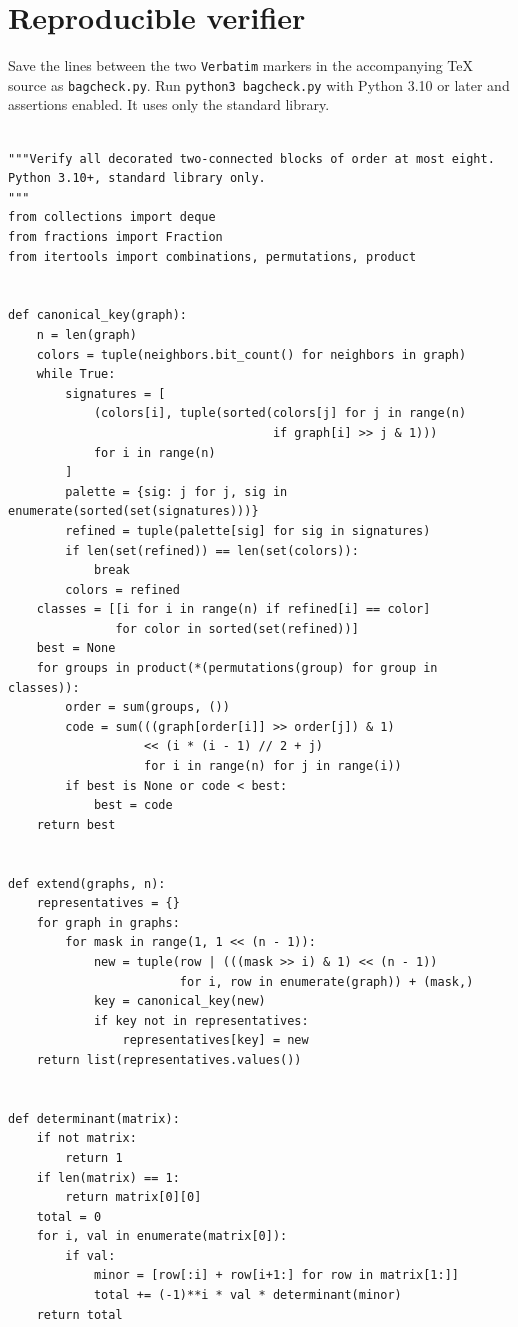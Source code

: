 \documentclass[11pt,a4paper]{article}
\begin{document}
\section{Reproducible verifier}
Save the lines between the two \texttt{Verbatim} markers in the accompanying TeX source as \texttt{bagcheck.py}. Run \texttt{python3 bagcheck.py} with Python 3.10 or later and assertions enabled. It uses only the standard library.
\smallskip
\begin{Verbatim}[fontsize=\scriptsize]

"""Verify all decorated two-connected blocks of order at most eight.
Python 3.10+, standard library only.
"""
from collections import deque
from fractions import Fraction
from itertools import combinations, permutations, product


def canonical_key(graph):
    n = len(graph)
    colors = tuple(neighbors.bit_count() for neighbors in graph)
    while True:
        signatures = [
            (colors[i], tuple(sorted(colors[j] for j in range(n)
                                     if graph[i] >> j & 1)))
            for i in range(n)
        ]
        palette = {sig: j for j, sig in enumerate(sorted(set(signatures)))}
        refined = tuple(palette[sig] for sig in signatures)
        if len(set(refined)) == len(set(colors)):
            break
        colors = refined
    classes = [[i for i in range(n) if refined[i] == color]
               for color in sorted(set(refined))]
    best = None
    for groups in product(*(permutations(group) for group in classes)):
        order = sum(groups, ())
        code = sum(((graph[order[i]] >> order[j]) & 1)
                   << (i * (i - 1) // 2 + j)
                   for i in range(n) for j in range(i))
        if best is None or code < best:
            best = code
    return best


def extend(graphs, n):
    representatives = {}
    for graph in graphs:
        for mask in range(1, 1 << (n - 1)):
            new = tuple(row | (((mask >> i) & 1) << (n - 1))
                        for i, row in enumerate(graph)) + (mask,)
            key = canonical_key(new)
            if key not in representatives:
                representatives[key] = new
    return list(representatives.values())


def determinant(matrix):
    if not matrix:
        return 1
    if len(matrix) == 1:
        return matrix[0][0]
    total = 0
    for i, val in enumerate(matrix[0]):
        if val:
            minor = [row[:i] + row[i+1:] for row in matrix[1:]]
            total += (-1)**i * val * determinant(minor)
    return total



\end{Verbatim}
\end{document}
